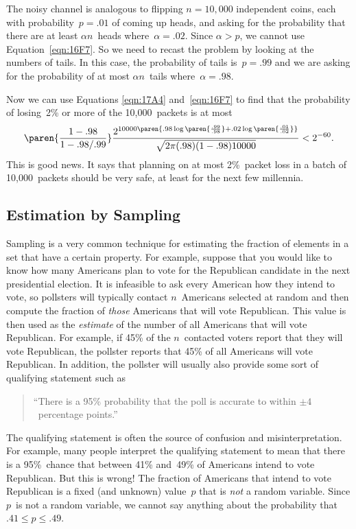 \begin{editingnotes}
The noisy channel is analogous to flipping $n = 10{,}000$ independent
coins, each with probability~$p = .01$ of coming up heads, and asking
for the probability that there are at least $\alpha n$~heads
where~$\alpha = .02$.  Since $\alpha > p$, we cannot use
Equation~\ref{eqn:16F7}.  So we need to recast the problem by looking
at the numbers of tails.  In this case, the probability of tails is~$p
= .99$ and we are asking for the probability of at most $\alpha
n$~tails where~$\alpha = .98$.

Now we can use Equations \ref{eqn:17A4} and~\ref{eqn:16F7} to find
that the probability of losing~2\% or more of the 10,000~packets is at
most
\begin{equation*}
    \paren{\frac{1 - .98}{1 - .98/.99}}
    \frac{ 2^{10000\paren{.98 \log\paren{\frac{.99}{.98}}
                        + .02 \log\paren{\frac{.01}{.02}}} } }
         {\sqrt{2\pi (.98)(1 - .98) 10000}}
    < 2^{-60}.
\end{equation*}
This is good news.  It says that planning on at most 2\%~packet loss
in a batch of 10,000~packets should be very safe, at least for the
next few millennia.

\subsection{Estimation by Sampling}\label{sec:sampling}

Sampling is a very common technique for estimating the fraction of
elements in a set that have a certain property.  For example, suppose
that you would like to know how many Americans plan to vote for the
Republican candidate in the next presidential election.  It is
infeasible to ask every American how they intend to vote, so pollsters
will typically contact $n$~Americans selected at random and then
compute the fraction of \emph{those} Americans that will vote
Republican.  This value is then used as the \emph{estimate} of the
number of all Americans that will vote Republican.  For example, if
45\% of the $n$~contacted voters report that they will vote
Republican, the pollster reports that 45\% of all Americans will vote
Republican.  In addition, the pollster will usually also provide some
sort of qualifying statement such as
\begin{quote}
``There is a 95\% probability that the poll is accurate to within $\pm
  4$~percentage points.''
\end{quote}

The qualifying statement is often the source of confusion and
misinterpretation.  For example, many people interpret the qualifying
statement to mean that there is a 95\%~chance that between 41\%
and~49\% of Americans intend to vote Republican.  But this is wrong!
The fraction of Americans that intend to vote Republican is a fixed
(and unknown) value~$p$ that is \emph{not} a random variable.  Since
$p$~is not a random variable, we cannot say anything about the
probability that $.41 \le p \le .49$.


\end{editingnotes}

